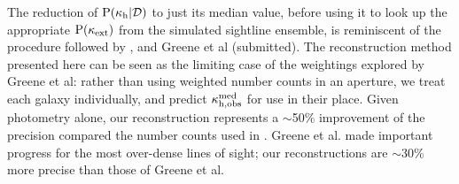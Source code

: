 \documentclass[useAMS,usenatbib,a4paper]{mn2e}
\begin{document}

The reduction of ${\rm P}(\kappa_{\rm h}|{\mathcal{D}})$ to just its median value, before using
it to look up the appropriate ${\rm P}(\kappa_{\rm ext})$ from the simulated sightline
ensemble, is reminiscent of the procedure followed by \citet{SuyuEtal2010},
and Greene et al (submitted). The reconstruction method presented here can be
seen as the limiting case of the weightings explored by Greene et al: rather
than using weighted number counts in an aperture, we treat each galaxy
individually, and predict $\kappa_{\rm h,obs}^{\rm med}$ for use in their
place. Given photometry alone, our reconstruction represents a $\sim$50\% improvement of
the precision compared the number counts used in \citet{SuyuEtal2010}. Greene et al.
made important progress for the most over-dense lines of sight; our
reconstructions are $\sim$30\% more precise than those of Greene et al.
\end{document}
